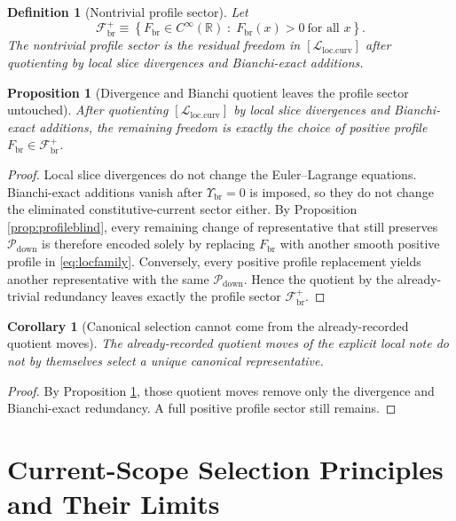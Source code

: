 \documentclass[11pt]{article}
\newcommand{\CurvSeedMult}{\Upsilon_{\mathrm{br}}}
\newcommand{\CurvProfile}{F_{\mathrm{br}}}
\newcommand{\CurvFamily}{\mathscr F_{\mathrm{br}}^{+}}
\newcommand{\CurvQuot}{[\mathcal L_{\mathrm{loc.curv}}]}
\newcommand{\DownPkg}{\mathscr P_{\mathrm{down}}}
\newtheorem{definition}{Definition}
\newtheorem{proposition}{Proposition}
\newtheorem{corollary}{Corollary}
\begin{document}
\begin{definition}[Nontrivial profile sector]
\label{def:profilesector}
Let
\begin{equation}
\CurvFamily
\equiv
\left\{
\CurvProfile\in C^\infty(\mathbb R)\;:\;
\CurvProfile(x)>0\ \text{for all }x
\right\}.
\label{eq:profilefamily}
\end{equation}
The \emph{nontrivial profile sector} is the residual freedom in \(\CurvQuot\) after quotienting by local slice divergences and Bianchi-exact additions.
\end{definition}

\begin{proposition}[Divergence and Bianchi quotient leaves the profile sector untouched]
\label{prop:quotient}
After quotienting \(\CurvQuot\) by local slice divergences and Bianchi-exact additions, the remaining freedom is exactly the choice of positive profile \(\CurvProfile\in\CurvFamily\).
\end{proposition}

\begin{proof}
Local slice divergences do not change the Euler--Lagrange equations. Bianchi-exact additions vanish after \(\CurvSeedMult=0\) is imposed, so they do not change the eliminated constitutive-current sector either. By Proposition \ref{prop:profileblind}, every remaining change of representative that still preserves \(\DownPkg\) is therefore encoded solely by replacing \(\CurvProfile\) with another smooth positive profile in \eqref{eq:locfamily}. Conversely, every positive profile replacement yields another representative with the same \(\DownPkg\). Hence the quotient by the already-trivial redundancy leaves exactly the profile sector \(\CurvFamily\).
\end{proof}

\begin{corollary}[Canonical selection cannot come from the already-recorded quotient moves]
\label{cor:noquotientsel}
The already-recorded quotient moves of the explicit local note do not by themselves select a unique canonical representative.
\end{corollary}

\begin{proof}
By Proposition \ref{prop:quotient}, those quotient moves remove only the divergence and Bianchi-exact redundancy. A full positive profile sector still remains.
\end{proof}

\section{Current-Scope Selection Principles and Their Limits}
\end{document}
